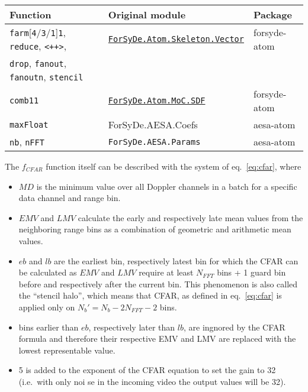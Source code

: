 \documentclass[
  a4paper,
]{article}
\begin{document}
\begin{longtable}[]{@{}lll@{}}
\toprule
Function & Original module & Package\tabularnewline
\midrule
\endhead
\texttt{farm}{[}\texttt{4}/\texttt{3}/\texttt{1}{]}\texttt{1},
\texttt{reduce}, \texttt{\textless{}++\textgreater{}}, &
\href{https://forsyde.github.io/forsyde-atom/api/ForSyDe-Atom-Skeleton-Vector.html}{\texttt{ForSyDe.Atom.Skeleton.Vector}}
& forsyde-atom\tabularnewline
\texttt{drop}, \texttt{fanout}, \texttt{fanoutn}, \texttt{stencil} &
&\tabularnewline
\texttt{comb11} &
\href{https://forsyde.github.io/forsyde-atom/api/ForSyDe-Atom-MoC-SDF.html}{\texttt{ForSyDe.Atom.MoC.SDF}}
& forsyde-atom\tabularnewline
\texttt{maxFloat} & ForSyDe.AESA.Coefs & aesa-atom\tabularnewline
\texttt{nb}, \texttt{nFFT} & \texttt{ForSyDe.AESA.Params} &
aesa-atom\tabularnewline
\bottomrule
\end{longtable}

The \(f_{CFAR}\) function itself can be described with the system of
eq.~\ref{eq:cfar}, where

\begin{itemize}
\item
  \(MD\) is the minimum value over all Doppler channels in a batch for a
  specific data channel and range bin.
\item
  \(EMV\) and \(LMV\) calculate the early and respectively late mean
  values from the neighboring range bins as a combination of geometric
  and arithmetic mean values.
\item
  \(eb\) and \(lb\) are the earliest bin, respectively latest bin for
  which the CFAR can be calculated as \(EMV\) and \(LMV\) require at
  least \(N_{FFT}\) bins + 1 guard bin before and respectively after the
  current bin. This phenomenon is also called the ``stencil halo'',
  which means that CFAR, as defined in eq.~\ref{eq:cfar} is applied only
  on \(N_b'=N_b-2N_{FFT}-2\) bins.
\item
  bins earlier than \(eb\), respectively later than \(lb\), are ingnored
  by the CFAR formula and therefore their respective EMV and LMV are
  replaced with the lowest representable value.
\item
  5 is added to the exponent of the CFAR equation to set the gain to 32
  (i.e.~with only noi se in the incoming video the output values will be
  32).
\end{itemize}
\end{document}
